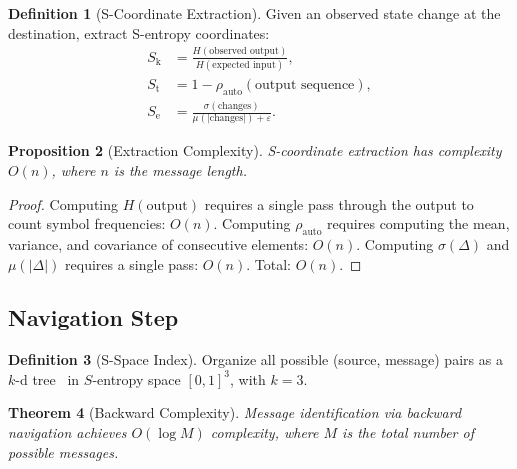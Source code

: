 \documentclass[11pt,twocolumn,a4paper]{article}
\newtheorem{theorem}{Theorem}[section]
\newtheorem{proposition}[theorem]{Proposition}
\theoremstyle{definition}
\newtheorem{definition}[theorem]{Definition}
\newcommand{\Sk}{S_{\mathrm{k}}}
\newcommand{\St}{S_{\mathrm{t}}}
\newcommand{\Se}{S_{\mathrm{e}}}
\newcommand{\eps}{\varepsilon}
\begin{document}
\begin{definition}[S-Coordinate Extraction]\label{def:extraction}
Given an observed state change at the destination, extract S-entropy coordinates:
\begin{align}
  \Sk &= \frac{H(\text{observed output})}{H(\text{expected input})}, \label{eq:extract_Sk} \\
  \St &= 1 - \rho_{\mathrm{auto}}(\text{output sequence}), \label{eq:extract_St} \\
  \Se &= \frac{\sigma(\text{changes})}{\mu(|\text{changes}|) + \eps}. \label{eq:extract_Se}
\end{align}
\end{definition}

\begin{proposition}[Extraction Complexity]\label{prop:extraction_complexity}
S-coordinate extraction has complexity $O(n)$, where $n$ is the message length.
\end{proposition}

\begin{proof}
Computing $H(\text{output})$ requires a single pass through the output to count symbol
frequencies: $O(n)$. Computing $\rho_{\mathrm{auto}}$ requires computing the mean,
variance, and covariance of consecutive elements: $O(n)$. Computing $\sigma(\Delta)$
and $\mu(|\Delta|)$ requires a single pass: $O(n)$. Total: $O(n)$.
\end{proof}

\subsection{Navigation Step}\label{sec:backward:navigation}

\begin{definition}[S-Space Index]\label{def:kdtree}
Organize all possible (source, message) pairs as a $k$-d tree~\cite{bentley1975} in
$S$-entropy space $[0,1]^3$, with $k = 3$.
\end{definition}

\begin{theorem}[Backward Complexity]\label{thm:backward_complexity}
Message identification via backward navigation achieves $O(\log M)$ complexity, where
$M$ is the total number of possible messages.
\end{theorem}
\end{document}
